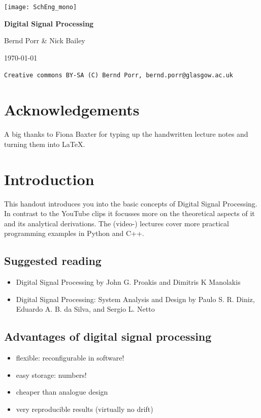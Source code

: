 \documentclass[12pt,a4paper]{article}
\begin{document}
\begin{center}
\mbox{\texttt{[image: SchEng\_mono]}}

\vfill

{\bf \Huge Digital Signal Processing}

\bigskip

{\Large Bernd Porr \& Nick Bailey}

\vfill

{\tiny \today}

\bigskip

\noindent\texttt{Creative commons BY-SA (C) Bernd Porr, bernd.porr@glasgow.ac.uk}




\end{center}

\clearpage

\tableofcontents

\clearpage

\section{Acknowledgements}
A big thanks to Fiona Baxter for typing up the handwritten lecture notes and turning
them into \LaTeX.

\section{Introduction}
This handout introduces you into the basic concepts of Digital Signal Processing.
In contrast to the YouTube clips it focusses more on the theoretical
aspects of it and its analytical derivations. The (video-) lectures
cover more practical programming examples in Python and C++.

\subsection{Suggested reading}
\begin{itemize}
\item Digital Signal Processing
by John G. Proakis and Dimitris K Manolakis
\item Digital Signal Processing: System Analysis and Design by Paulo S. R. Diniz, Eduardo A. B. da Silva, and Sergio L. Netto 
\end{itemize}

\subsection{Advantages of digital signal processing}
\begin{itemize}
\item flexible: reconfigurable in software!
\item easy storage: numbers!
\item cheaper than analogue design
\item very reproducible results (virtually no drift)
\end{itemize}
\end{document}
